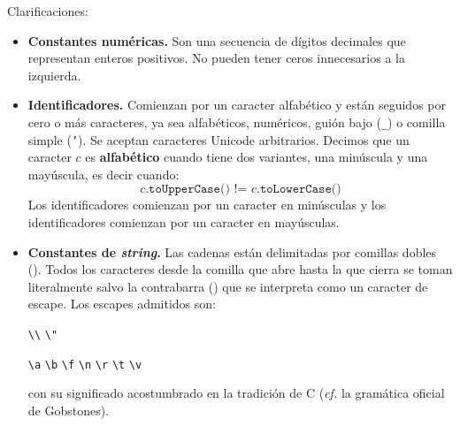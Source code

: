 \documentclass{article}
\begin{document}
Clarificaciones:
\begin{itemize}
\item {\bf Constantes num\'ericas.}
Son una secuencia de d\'igitos decimales que representan enteros positivos.
No pueden tener ceros innecesarios a la izquierda.
\item {\bf Identificadores.}
Comienzan por un caracter alfab\'etico y
est\'an seguidos por cero o m\'as caracteres,
ya sea alfab\'eticos, num\'ericos, gui\'on bajo (\texttt{\_}) o comilla simple (\texttt{'}).
Se aceptan caracteres Unicode arbitrarios. Decimos que un caracter $c$ es {\bf alfab\'etico}
cuando tiene dos variantes, una min\'uscula y una may\'uscula, es decir cuando:
\[
\texttt{$c$.toUpperCase() != $c$.toLowerCase()}
\]
Los identificadores  comienzan por un caracter en min\'usculas y
los identificadores  comienzan por un caracter en may\'usculas.

\item {\bf Constantes de {\em string}.}
Las cadenas est\'an delimitadas por comillas dobles ().
Todos los caracteres desde la comilla que abre hasta la que cierra se
toman literalmente salvo la contrabarra (\chr{\textbackslash}) que se
interpreta como un caracter de escape.
Los escapes admitidos son:
\begin{center}
\texttt{\textbackslash\textbackslash}
\hspace{1cm}
\texttt{\textbackslash"}
\end{center}
\begin{center}
\texttt{\textbackslash{a}}
\hspace{1cm}
\texttt{\textbackslash{b}}
\hspace{1cm}
\texttt{\textbackslash{f}}
\hspace{1cm}
\texttt{\textbackslash{n}}
\hspace{1cm}
\texttt{\textbackslash{r}}
\hspace{1cm}
\texttt{\textbackslash{t}}
\hspace{1cm}
\texttt{\textbackslash{v}}
\end{center}
con su significado acostumbrado en la tradici\'on de C
({\em cf.} la gram\'atica oficial de Gobstones).
\end{itemize}
\bigskip
\end{document}
